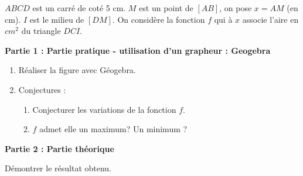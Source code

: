 
$ABCD$ est un carré de coté 5 cm. $M$ est un point de $[AB]$, on pose $x=AM$ (en cm). $I$ est le milieu de
$[DM]$. On considère la fonction $f$ qui à $x$ associe l'aire en $cm^2$ du triangle $DCI$.

\vspace{0.2cm}

\textbf{Partie 1 : Partie pratique - utilisation d’un grapheur : Geogebra}

\vspace{0.2cm}

\begin{enumerate}
\item Réaliser la figure avec Géogebra.
\item Conjectures :
	\begin{enumerate}
		\item Conjecturer les variations de la fonction $f$.
		\item $f$ admet elle un maximum? Un minimum ?
	\end{enumerate}

\end{enumerate}

\vspace{0.2cm}

\textbf{Partie 2 : Partie théorique}

\vspace{0.2cm}

Démontrer le résultat obtenu.